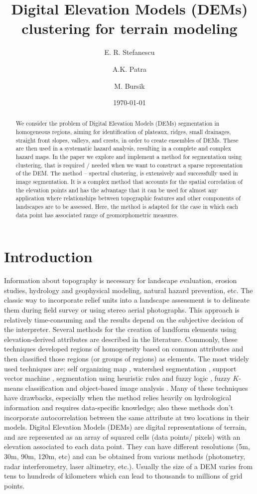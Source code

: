 \documentclass[12pt,letterpaper]{article}
\title{Digital Elevation Models (DEMs) clustering for terrain modeling}
\author[1]{ E. R. Stefanescu }
\author[1]{A.K. Patra}
\author[2]{M. Bursik}
\affil[1]{Department of Mechanical and Aerospace Engineering, University at Buffalo, Buffalo, NY 14260}
\affil[2]{Department of Geology, University at Buffalo, Buffalo, NY 14260 }
\date{\today}
\begin{document}
\linenumbers
\maketitle

\begin{abstract}
We consider the problem of Digital Elevation Models (DEMs) segmentation 
in homogeneous regions, aiming for identification of plateaux, ridges, small drainages,
straight front slopes, valleys, and crests, in order to create ensembles of DEMs. These 
are then used in a systematic hazard analysis, resulting in a complete and complex
hazard maps. In the paper we explore and implement a method 
for segmentation using clustering, that is required / needed when we want to construct a 
sparse representation of the DEM.  The method -- spectral clustering, is extensively and 
successfully used in image segmentation. It is a complex 
method that accounts for the spatial correlation of the 
elevation points and has the advantage that it can be used for almost any application 
where relationships between topographic features and other components of landscapes 
are to be assessed. Here, the method is adapted for the case in 
which each data point has associated range of geomorphometric measures. 
\end{abstract}

\section{Introduction}
Information about topography is necessary for landscape evaluation, erosion studies,
hydrology and geophysical modeling, natural hazard prevention, etc. The classic way to 
incorporate relief units into a landscape assessment is to delineate them during field survey
or using stereo aerial photographs. This approach is relatively time-consuming and the results
depend on the subjective decision of the interpreter.
Several methods for the creation of landform elements using elevation-derived attributes are
described in the literature. Commonly, these techniques developed regions of homogeneity based
on common attributes and then classified those regions (or groups of regions) as elements. The 
most widely used techniques are: self organizing map \citep{Koh1995}, watershed segmentation 
\citep{Najman1996}, support vector machine \citep{Gunn1997}, segmentation using heuristic rules 
and fuzzy logic \citep{Sonka1999}, fuzzy $K$-means classification \citep{Burrough2000} and object-based 
image analysis \citep{Carleer2005}. Many of these techniques have drawbacks, especially when the
 method relies heavily on hydrological information and  requires data-specific knowledge; also these 
 methods don't incorporate autocorrelation between the same attribute at two locations in their models.
Digital Elevation Models (DEMs) are digital representations of terrain, and are represented as an 
array of squared cells (data points/ pixels) with an elevation associated to each data point. They can 
have different resolutions (5m, 30m, 90m, 120m, etc) and can be obtained from various methods 
(photometry, radar interferometry, laser altimetry, etc.). Usually the size of a DEM varies from
tens to hundreds of kilometers which can lead to thousands to millions of grid points. 
 
\end{document}
